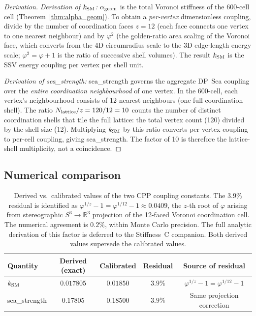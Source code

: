 \documentclass[11pt,a4paper]{article}
\newcommand{\phig}{\varphi}
\begin{document}
\begin{proof}[Derivation]
\textit{Derivation of $k_{\rm SM}$:}
$\alpha_{\rm geom}$ is the total Voronoi stiffness of the 600-cell
cell (Theorem~\ref{thm:alpha_geom}).  To obtain a
\emph{per-vertex} dimensionless coupling, divide by the number of
coordination faces $z = 12$ (each face connects one vertex to one
nearest neighbour) and by $\phig^2$ (the golden-ratio area scaling
of the Voronoi face, which converts from the 4D circumradius scale
to the 3D edge-length energy scale; $\phig^2 = \phig + 1$ is the
ratio of successive shell volumes).  The result $k_{\rm SM}$ is the
SSV energy coupling per vertex per shell unit.

\textit{Derivation of sea\_strength:}
sea\_strength governs the aggregate DP~Sea coupling over the
\emph{entire coordination neighbourhood} of one vertex.  In the
600-cell, each vertex's neighbourhood consists of 12 nearest
neighbours (one full coordination shell).  The ratio
$N_{\rm lattice}/z = 120/12 = 10$ counts the number of distinct
coordination shells that tile the full lattice: the total vertex
count (120) divided by the shell size (12).  Multiplying
$k_{\rm SM}$ by this ratio converts per-vertex coupling to
per-cell coupling, giving sea\_strength.  The factor of 10 is
therefore the lattice-shell multiplicity, not a coincidence.
\end{proof}

\subsection{Numerical comparison}

\begin{table}[h]
\centering
\begin{tabular}{lcccc}
\toprule
Quantity & Derived (exact) & Calibrated & Residual & Source of residual \\
\midrule
$k_{\rm SM}$ & $0.017805$ & $0.01850$ & $3.9\%$ &
  $\phig^{1/z} - 1 = \phig^{1/12} - 1$ \\
sea\_strength & $0.17805$ & $0.18500$ & $3.9\%$ &
  Same projection correction \\
\bottomrule
\end{tabular}
\caption{Derived vs.\ calibrated values of the two CPP coupling
constants.  The $3.9\%$ residual is identified as $\phig^{1/z} - 1
= \phig^{1/12} - 1 \approx 0.0409$, the $z$-th root of $\phig$
arising from stereographic $S^3 \to \mathbb{R}^3$ projection of
the 12-faced Voronoi coordination cell.  The numerical agreement
is $0.2\%$, within Monte Carlo precision.  The full analytic
derivation of this factor is deferred to the Stiffness~C companion.
Both derived values supersede the calibrated values.}
\label{tab:sea_strength}
\end{table}
\end{document}
